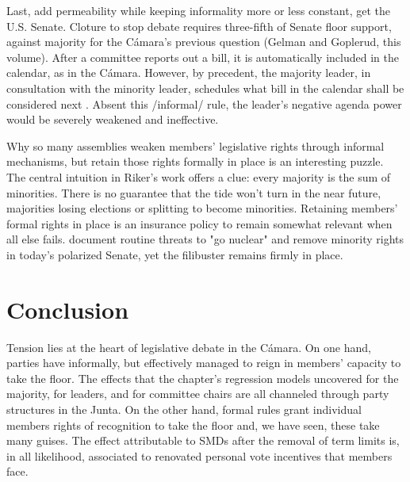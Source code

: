 \documentclass[letter,12pt]{article}
\begin{document}
Last, add permeability while keeping informality more or less constant, get the U.S. Senate. Cloture to stop debate requires three-fifth of Senate floor support, against majority for the Cámara's previous question (Gelman and Goplerud, this volume). After a committee reports out a bill, it is automatically included in the calendar, as in the Cámara. However, by precedent, the majority leader, in consultation with the minority leader, schedules what bill in the calendar shall be considered next \citep{roberts-smith.2007,campbell.cox.mccubbins.2002}. Absent this /informal/ rule, the leader's negative agenda power would be severely weakened and ineffective.

Why so many assemblies weaken members' legislative rights through informal mechanisms, but retain those rights formally in place is an interesting puzzle. The central intuition in Riker's work offers a clue: every majority is the sum of minorities. There is no guarantee that the tide won't turn in the near future, majorities losing elections or splitting to become minorities. Retaining members' formal rights in place is an insurance policy to remain somewhat relevant when all else fails. \citet{wawro.schickler.filibuster.2007} document routine threats to "go nuclear" and remove minority rights in today's polarized Senate, yet the filibuster remains firmly in place.




\section{Conclusion} %

Tension lies at the heart of legislative debate in the Cámara. On one hand, parties have informally, but effectively managed to reign in members' capacity to take the floor. The effects that the chapter's regression models uncovered for the majority, for leaders, and for committee chairs are all channeled through party structures in the Junta. On the other hand, formal rules grant individual members rights of recognition to take the floor and, we have seen, these take many guises. The effect attributable to SMDs after the removal of term limits is, in all likelihood, associated to renovated personal vote incentives that members face. 
\end{document}
